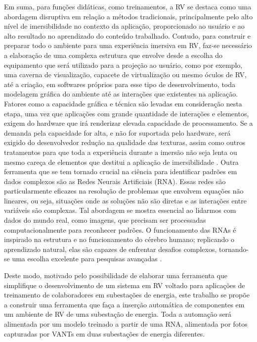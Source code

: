 Em suma, para funções didáticas, como treinamentos, a RV se destaca como uma abordagem disruptiva em relação a métodos tradicionais, principalmente pelo alto nível de imersibilidade no contexto da aplicação, proporcionado ao usuário e ao alto resultado no aprendizado do conteúdo trabalhado. Contudo, para construir e preparar todo o ambiente para uma experiência imersiva em RV, faz-se necessário a elaboração de uma complexa estrutura que envolve desde a escolha do equipamento que será utilizado para a projeção ao usuário, como por exemplo, uma caverna de visualização, capacete de virtualização ou mesmo óculos de RV, até a criação, em softwares próprios para esse tipo de desenvolvimento, toda modelagem gráfica do ambiente até as interações que existentes na aplicação. Fatores como a capacidade gráfica e técnica são levadas em consideração nesta etapa, uma vez que aplicações com grande quantidade de interações e elementos, exigem do hardware que irá renderizar elevada capacidade de processamento. Se a demanda pela capacidade for alta, e não for suportada pelo hardware, será exigido do desenvolvedor redução na qualidade das texturas, assim como outros tratamentos para que toda a experiência durante a imersão não seja lenta ou mesmo careça de elementos que destitui a aplicação de imersibilidade \cite{palmeira2020uncanny}. 
Outra ferramenta que se tem tornado crucial na ciência para identificar padrões em dados complexos são as Redes Neurais Artificiais (RNA). Essas redes são particularmente eficazes na resolução de problemas que envolvem equações não lineares, ou seja, situações onde as soluções não são diretas e as interações entre variáveis são complexas. Tal abordagem se mostra essencial ao lidarmos com dados do mundo real, como imagens, que precisam ser processadas computacionalmente para reconhecer padrões. O funcionamento das RNAs é inspirado na estrutura e no funcionamento do cérebro humano; replicando o aprendizado natural, elas são capazes de enfrentar desafios complexos, tornando-se uma escolha excelente para pesquisas avançadas \cite{ougcu2012forecasting}.

Deste modo, motivado pelo possibilidade de elaborar uma ferramenta que simplifique o desenvolvimento de um sistema em RV voltado para aplicações de treinamento de colaboradores em subestações de energia, este trabalho se propõe a construir uma ferramenta que faça a inserção automática de componentes em um ambiente de RV de uma subestação de energia. Toda a automação será alimentada por um modelo treinado a partir de uma RNA, alimentada por fotos capturadas por VANTs em duas subestações de energia diferentes.


